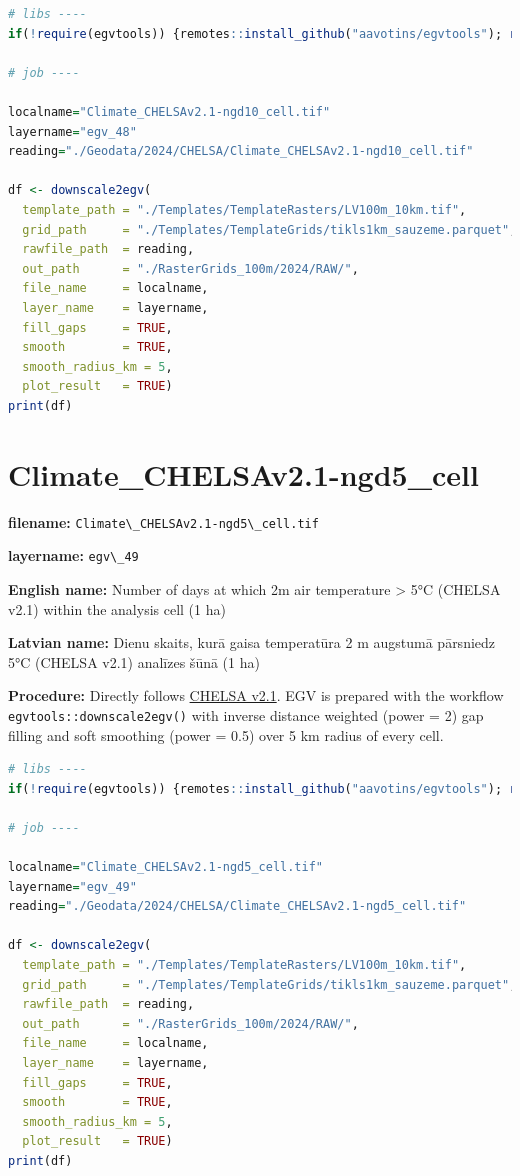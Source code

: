 \documentclass[
]{book}
\newcommand{\passthrough}[1]{#1}
\begin{document}
\begin{lstlisting}[language=R]
# libs ----
if(!require(egvtools)) {remotes::install_github("aavotins/egvtools"); require(egvtools)}

# job ----

localname="Climate_CHELSAv2.1-ngd10_cell.tif"
layername="egv_48"
reading="./Geodata/2024/CHELSA/Climate_CHELSAv2.1-ngd10_cell.tif"

df <- downscale2egv(
  template_path = "./Templates/TemplateRasters/LV100m_10km.tif",
  grid_path     = "./Templates/TemplateGrids/tikls1km_sauzeme.parquet",
  rawfile_path  = reading,
  out_path      = "./RasterGrids_100m/2024/RAW/",
  file_name     = localname,
  layer_name    = layername,
  fill_gaps     = TRUE,
  smooth        = TRUE,
  smooth_radius_km = 5,
  plot_result   = TRUE)
print(df)
\end{lstlisting}

\section{Climate\_CHELSAv2.1-ngd5\_cell}\label{ch06.049}

\textbf{filename:} \passthrough{\lstinline!Climate\_CHELSAv2.1-ngd5\_cell.tif!}

\textbf{layername:} \passthrough{\lstinline!egv\_49!}

\textbf{English name:} Number of days at which 2m air temperature \textgreater{} 5°C (CHELSA v2.1) within the analysis cell (1 ha)

\textbf{Latvian name:} Dienu skaits, kurā gaisa temperatūra 2 m augstumā pārsniedz 5°C (CHELSA v2.1) analīzes šūnā (1 ha)

\textbf{Procedure:} Directly follows \hyperref[Ch04.11]{CHELSA v2.1}. EGV is prepared with the
workflow \passthrough{\lstinline!egvtools::downscale2egv()!} with inverse distance weighted (power = 2)
gap filling and soft smoothing (power = 0.5) over 5 km radius of every cell.

\begin{lstlisting}[language=R]
# libs ----
if(!require(egvtools)) {remotes::install_github("aavotins/egvtools"); require(egvtools)}

# job ----

localname="Climate_CHELSAv2.1-ngd5_cell.tif"
layername="egv_49"
reading="./Geodata/2024/CHELSA/Climate_CHELSAv2.1-ngd5_cell.tif"

df <- downscale2egv(
  template_path = "./Templates/TemplateRasters/LV100m_10km.tif",
  grid_path     = "./Templates/TemplateGrids/tikls1km_sauzeme.parquet",
  rawfile_path  = reading,
  out_path      = "./RasterGrids_100m/2024/RAW/",
  file_name     = localname,
  layer_name    = layername,
  fill_gaps     = TRUE,
  smooth        = TRUE,
  smooth_radius_km = 5,
  plot_result   = TRUE)
print(df)
\end{lstlisting}
\end{document}

